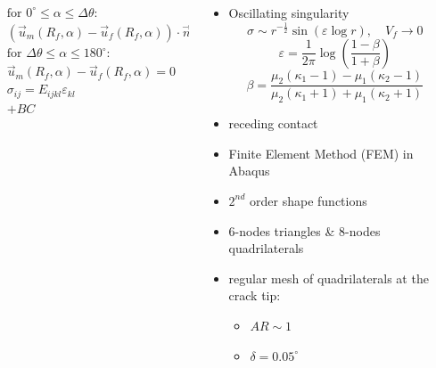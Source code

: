 \documentclass[first,firstsupp,lastsupp,last,hyperref,table]{ETHclass}
\begin{document}
\begin{frame}
\begin{columns}
\begin{column}{0.6\textwidth}
\begin{columns}
\begin{column}{0.7\columnwidth}
\begin{equation*}
\begin{aligned}
&\text{for } 0^{\circ}\leq\alpha\leq\Delta\theta:\\
&\left(\overrightarrow{u}_{m}\left(R_{f},\alpha\right)-\overrightarrow{u}_{f}\left(R_{f},\alpha\right)\right)\cdot\overrightarrow{n}_{\alpha}\geq 0\\
&\text{for } \Delta\theta\leq\alpha\leq 180^{\circ}:\\
&\overrightarrow{u}_{m}\left(R_{f},\alpha\right)-\overrightarrow{u}_{f}\left(R_{f},\alpha\right)=0\\
&\sigma_{ij}=E_{ijkl}\varepsilon_{kl}\\
&+BC
\end{aligned}
\end{equation*}
\end{column}
\end{columns}
\end{column}
\begin{column}{0.35\textwidth}
\scriptsize
\begin{itemize}[label=]
\item Oscillating singularity
\vspace{-0.25cm}
\begin{equation*}
\sigma\sim r^{-\frac{1}{2}}\sin\left(\varepsilon\log r\right),\quad V_{f}\rightarrow 0
\end{equation*}
{\tiny
\begin{equation*}
\varepsilon=\frac{1}{2\pi}\log\left(\frac{1-\beta}{1+\beta}\right)
\end{equation*}
\begin{equation*}
\beta=\frac{\mu_{2}\left(\kappa_{1}-1\right)-\mu_{1}\left(\kappa_{2}-1\right)}{\mu_{2}\left(\kappa_{1}+1\right)+\mu_{1}\left(\kappa_{2}+1\right)}
\end{equation*}}
\item receding contact
\item Finite Element Method (FEM) in Abaqus\texttrademark
\item $2^{nd}$ order shape functions
\item 6-nodes triangles \& 8-nodes quadrilaterals
\item regular mesh of quadrilaterals at the crack tip:
\begin{itemize}[label=-]
\item $AR\sim 1$
\item $\delta=0.05^{\circ}$
\end{itemize}
\end{itemize}
\end{column}
\end{columns}
\end{frame}
\end{document}
